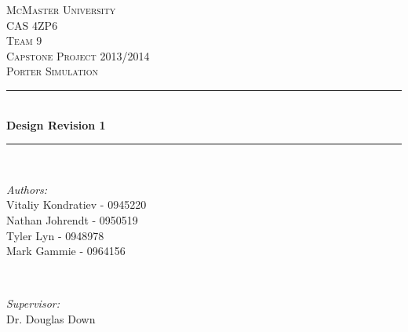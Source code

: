 \documentclass[paper=letter, fontsize=10pt]{scrartcl}
\numberwithin{equation}{section}		%
\numberwithin{figure}{section}			%
\numberwithin{table}{section}				%
\begin{document}
\begin{titlepage}

\newcommand{\HRule}{\rule{\linewidth}{0.5mm}} %
\newcommand{\authors}{\shortstack{Vitaliy Kondratiev,\\Nathan Johrendt,\\Tyler Lyn,\\Mark Gammie}}

\begin{center}
 

\textsc{\LARGE McMaster University}\\[1.5cm] %
\textsc{\Large CAS 4ZP6}\\[0.5cm]
\textsc{\Large Team 9} \\[0.5cm]
\textsc{\Large Capstone Project 2013/2014}\\[0.5cm] %
\textsc{\large Porter Simulation}\\[0.5cm] %


\HRule \\[0.4cm]
{ \huge \bfseries Design Revision 1}\\[0.4cm] %
\HRule \\[1.5cm]
 

\begin{minipage}{0.4\textwidth}
\begin{flushleft} \large
\emph{Authors:}\\
Vitaliy Kondratiev - 0945220\\
Nathan Johrendt - 0950519\\
Tyler Lyn - 0948978\\
Mark Gammie - 0964156\\
\end{flushleft}
\end{minipage}
~
\begin{minipage}{0.4\textwidth}
\begin{flushright} \large
\emph{Supervisor:} \\
Dr. Douglas Down %
\end{flushright}
\end{minipage}\\[4cm]


\end{center}
\end{titlepage}
\end{document}
